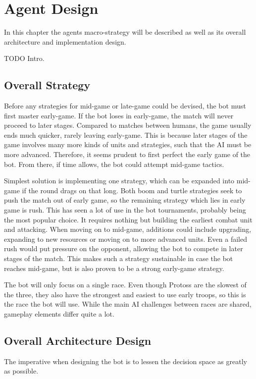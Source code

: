 \chapter{Agent Design}
In this chapter the agents macro-strategy will be described as well as its overall architecture and implementation design.

TODO Intro.

\section{Overall Strategy}
Before any strategies for mid-game or late-game could be devised, the bot must first master early-game. If the bot loses in early-game, the match will never proceed to later stages. Compared to matches between humans, the game usually ends much quicker, rarely leaving early-game. This is because later stages of the game involves many more kinds of units and strategies, such that the AI must be more advanced. Therefore, it seems prudent to first perfect the early game of the bot. From there, if time allows, the bot could attempt mid-game tactics.

Simplest solution is implementing one strategy, which can be expanded into mid-game if the round drags on that long. Both boom and turtle strategies seek to push the match out of early game, so the remaining strategy which lies in early game is rush. This has seen a lot of use in the bot tournaments, probably being the most popular choice. It requires nothing but building the earliest combat unit and attacking. When moving on to mid-game, additions could include upgrading, expanding to new resources or moving on to more advanced units. Even a failed rush would put pressure on the opponent, allowing the bot to compete in later stages of the match. This makes such a strategy sustainable in case the bot reaches mid-game, but is also proven to be a strong early-game strategy.

The bot will only focus on a single race. Even though Protoss are the slowest of the three, they also have the strongest and easiest to use early troops, so this is the race the bot will use. While the main AI challenges between races are shared, gameplay elements differ quite a lot.

\section{Overall Architecture Design}
The imperative when designing the bot is to lessen the decision space as greatly as possible.

